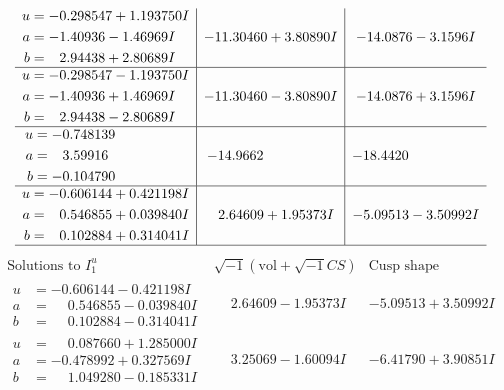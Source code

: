 \documentclass[1p]{elsarticle_modified}
\theoremstyle{definition}
\newcommand{\I}{\sqrt{-1}}
\begin{document}
$$\begin{array}{c|c|c}
\begin{aligned}
u &= -0.298547 + 1.193750 I \\
a &= -1.40936 - 1.46969 I \\
b &= \phantom{-}2.94438 + 2.80689 I\end{aligned}
 & -11.30460 + 3.80890 I & -14.0876 - 3.1596 I \\ \hline\begin{aligned}
u &= -0.298547 - 1.193750 I \\
a &= -1.40936 + 1.46969 I \\
b &= \phantom{-}2.94438 - 2.80689 I\end{aligned}
 & -11.30460 - 3.80890 I & -14.0876 + 3.1596 I \\ \hline\begin{aligned}
u &= -0.748139\phantom{ +0.000000I} \\
a &= \phantom{-}3.59916\phantom{ +0.000000I} \\
b &= -0.104790\phantom{ +0.000000I}\end{aligned}
 & -14.9662\phantom{ +0.000000I} & -18.4420\phantom{ +0.000000I} \\ \hline\begin{aligned}
u &= -0.606144 + 0.421198 I \\
a &= \phantom{-}0.546855 + 0.039840 I \\
b &= \phantom{-}0.102884 + 0.314041 I\end{aligned}
 & \phantom{-}2.64609 + 1.95373 I & -5.09513 - 3.50992 I\\
 \hline 
 \end{array}$$\newpage$$\begin{array}{c|c|c}  
\text{Solutions to }I^u_{1}& \I (\text{vol} + \sqrt{-1}CS) & \text{Cusp shape}\\
 \hline 
\begin{aligned}
u &= -0.606144 - 0.421198 I \\
a &= \phantom{-}0.546855 - 0.039840 I \\
b &= \phantom{-}0.102884 - 0.314041 I\end{aligned}
 & \phantom{-}2.64609 - 1.95373 I & -5.09513 + 3.50992 I \\ \hline\begin{aligned}
u &= \phantom{-}0.087660 + 1.285000 I \\
a &= -0.478992 + 0.327569 I \\
b &= \phantom{-}1.049280 - 0.185331 I\end{aligned}
 & \phantom{-}3.25069 - 1.60094 I & -6.41790 + 3.90851 I \\ \hline\begin{aligned}

\end{aligned}
\end{array}$$
\end{document}
